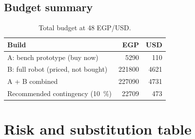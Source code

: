 \documentclass[11pt,a4paper]{article}
\begin{document}
\subsection{Budget summary}

\begin{table}[h]
\centering
\caption{Total budget at \num{48} EGP/USD.}
\label{tab:budget}
\begin{tabular}{@{}lrr@{}}
\toprule
\textbf{Build} & \textbf{EGP} & \textbf{USD}\\
\midrule
A: bench prototype (buy now)        & \num{5290}   & 110\\
B: full robot (priced, not bought)  & \num{221800} & \num{4621}\\
\midrule
A + B combined                      & \num{227090} & \num{4731}\\
Recommended contingency (\SI{10}{\percent}) & \num{22709} & 473\\
\bottomrule
\end{tabular}
\end{table}

\section{Risk and substitution table}
\end{document}
